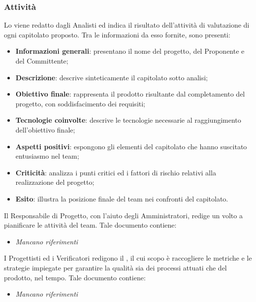         \subsubsection{Attività}
        Lo \SdF{} viene redatto dagli Analisti ed indica il risultato dell'attività di valutazione di ogni capitolato proposto. Tra le informazioni da esso fornite, sono presenti:
        \begin{itemize}
            \item{\textbf{Informazioni generali}: presentano il nome del progetto, del Proponente e del Committente;}
            \item{\textbf{Descrizione}: descrive sinteticamente il capitolato sotto analisi;}
            \item{\textbf{Obiettivo finale}: rappresenta il prodotto risultante dal completamento del progetto, con soddisfacimento dei requisiti;}
            \item{\textbf{Tecnologie coinvolte}: descrive le tecnologie necessarie al raggiungimento dell'obiettivo finale;}
            \item{\textbf{Aspetti positivi}: espongono gli elementi del capitolato che hanno suscitato entusiasmo nel team;}
            \item{\textbf{Criticità}: analizza i punti critici ed i fattori di rischio relativi alla realizzazione del progetto;}
            \item{\textbf{Esito}: illustra la posizione finale del team nei confronti del capitolato.}
        \end{itemize}
        
        Il Responsabile di Progetto, con l'aiuto degli Amministratori, redige un \PdP{} volto a pianificare le attività del team. Tale documento contiene:
        \begin{itemize}
        		\item{\textit{Mancano riferimenti}}
        \end{itemize}
        
        I Progettisti ed i Verificatori redigono il \PdQ{}, il cui scopo è raccogliere le metriche e le strategie impiegate per garantire la qualità sia dei processi attuati che del prodotto, nel tempo. Tale documento contiene:
        \begin{itemize}
        		\item{\textit{Mancano riferimenti}}
        \end{itemize}
        
